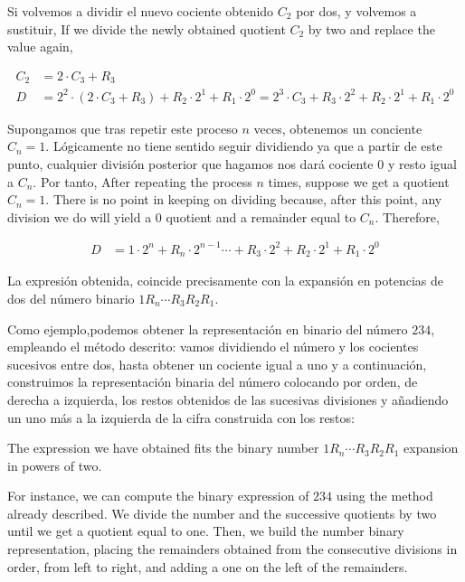 \begin{paracol}{2}
Si volvemos a dividir el nuevo cociente obtenido $C_2$ por dos, y volvemos a sustituir,
\switchcolumn
If we divide the newly obtained quotient $C_2$ by two and replace the value again,
\end{paracol}
 \begin{align*}
C_2&=2\cdot C_3+R_3 \\
D&=2^2\cdot(2\cdot C_3+R_3)+R_2\cdot 2^1+R_1\cdot 2^0=2^3\cdot C_3+R_3\cdot 2^2 +R_2\cdot 2^1+R_1\cdot 2^0
\end{align*}
\begin{paracol}{2}
Supongamos que tras repetir este proceso $n$ veces, obtenemos un conciente $C_n=1$. Lógicamente no tiene sentido seguir dividiendo ya que a partir de este punto, cualquier división posterior que hagamos nos dará cociente $0$ y resto igual a $C_n$. Por tanto,
\switchcolumn
After repeating the process $n$ times, suppose we get a quotient $C_n=1$. There is no point in keeping on dividing because, after this point, any division we do will yield a $0$ quotient and a remainder equal to $C_n$. Therefore, 
\end{paracol}
 \begin{align*}
D&=1\cdot 2^n+R_n\cdot 2^{n-1}\cdots +R_3\cdot 2^2 +R_2\cdot 2^1+R_1\cdot 2^0
\end{align*}
\begin{paracol}{2}
La expresión obtenida, coincide precisamente con la expansión en potencias de dos del número binario $1R_n \cdots R_3R_2R_1$.


Como ejemplo,podemos obtener la representación en binario del número $234$, empleando el método descrito: vamos dividiendo el número y los cocientes sucesivos entre dos, hasta obtener un cociente igual a uno y a continuación, construimos la representación binaria del número colocando por orden, de derecha a izquierda, los restos  obtenidos de las sucesivas divisiones y añadiendo un uno más a la izquierda de la cifra construida con los restos:

\switchcolumn
The expression we have obtained fits the binary number $1R_n\cdots R_3R_2R_1$ expansion in powers of two.

For instance, we can compute the binary expression of $234$ using the method already described. We divide the number and the successive quotients by two until we get a quotient equal to one. Then, we build the number binary representation, placing the remainders obtained from the consecutive divisions in order, from left to right, and adding a one on the left of the remainders.  
\end{paracol}
